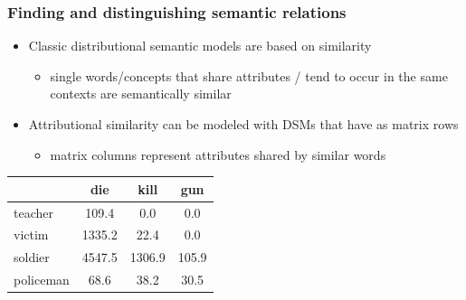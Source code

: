\begin{frame}
  \frametitle{Finding and distinguishing semantic relations}
  \begin{itemize}
  \item Classic distributional semantic models are based on
     similarity
    \begin{itemize}
    \item single words/concepts that share attributes / tend to occur
      in the same contexts are semantically similar
    \end{itemize}
  \item Attributional similarity can be modeled with DSMs that have 
  as matrix rows
  \begin{itemize}
  \item matrix columns represent attributes shared by similar words
\end{itemize}
  \end{itemize}
  \pause
   \begin{center}
   \begin{tabular}{l|c|c|c}

         &{\color{counterpoint}die}           &{\color{counterpoint}kill}           &{\color{counterpoint}gun} \\
\hline
{\color{blue}teacher}  &109.4         &0.0             &0.0  \\
{\color{blue}victim}   &1335.2        &22.4            &0.0 \\
{\color{blue}soldier}  &4547.5        &1306.9        &105.9\\
{\color{blue}policeman} &68.6          &38.2           &30.5\\

  \end{tabular}
  \end{center}

  
  
\end{frame}


